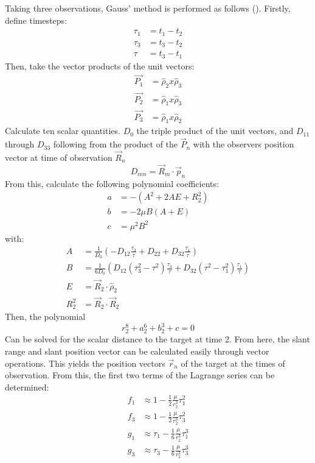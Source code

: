 Taking three observations, Gauss' method is performed as follows (\cite{curtis}). Firstly, define timesteps:
\begin{align}
    \tau_1 &= t_1 - t_2 \\
    \tau_3 &= t_3 - t_2 \\
    \tau &= t_3 - t_1
\end{align}
Then, take the vector products of the unit vectors:
\begin{align}
    \vec{P_1} &= \hat{\rho}_2 x \hat{\rho}_3 \\
    \vec{P_2} &= \hat{\rho}_1 x \hat{\rho}_3 \\
    \vec{P_3} &= \hat{\rho}_1 x \hat{\rho}_2
\end{align}
Calculate ten scalar quantities. $D_0$ the triple product of the unit vectors, and $D_{11}$ through $D_{33}$ following from the product of the $\vec{P}_n$ with the observers position vector at time of observation $\vec{R}_n$
\begin{equation}
    D_{mn} = \vec{R}_m \cdot \vec{p}_n
\end{equation}
From this, calculate the following polynomial coefficients:
\begin{align}
    a &= -\left(A^2 + 2AE + R_2^2\right) \\
    b &= -2\mu B\left(A + E\right) \\
    c &= \mu^2 B^2
\end{align}
with:
\begin{align}
    A &= \frac{1}{D_0}\left(-D_{12}\frac{\tau_3}{\tau} + D_{22} + D_{32}\frac{\tau_1}{\tau}\right) \\
    B &= \frac{1}{6D_0}\left( D_{12} \left(\tau_3^2 - \tau^2\right)\frac{\tau_3}{\tau} + D_{32}\left( \tau^2 - \tau_1^2\right)\frac{\tau_1}{\tau}\right) \\
    E &= \vec{R}_2 \cdot \hat{\rho}_2 \\
    R_2^2 &= \vec{R}_2 \cdot \vec{R}_2
\end{align}
Then, the polynomial
\begin{equation}
    r_2^8 + a_2^6 + b_2^3 + c = 0
    \label{eq:gausspolynomial}
\end{equation}
Can be solved for the scalar distance to the target at time 2. From here, the slant range and slant position vector can be calculated easily through vector operations. This yields the position vectors $\vec{r}_n$ of the target at the times of observation. From this, the first two terms of the Lagrange series can be determined:
\begin{align}
    f_1 &\approx 1- \frac{1}{2}\frac{\mu}{r_2^3}\tau_1^2 \\
    f_3 &\approx 1-\frac{1}{2}\frac{\mu}{r_2^3}\tau_3^2 \\
    g_1 &\approx \tau_1 - \frac{1}{6}\frac{\mu}{r_2^3}\tau_1^3 \\
    g_3 &\approx \tau_3 - \frac{1}{6} \frac{\mu}{r_2^3}\tau_3^3
\end{align}
